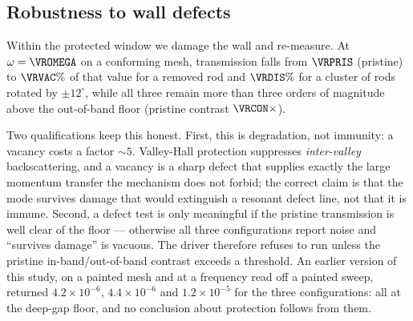 \documentclass[11pt]{article}
\begin{document}
\subsection{Robustness to wall defects}
Within the protected window we damage the wall and re-measure. At
$\omega=\VROMEGA$ on a conforming mesh, transmission falls from $\VRPRIS$
(pristine) to $\VRVAC\%$ of that value for a removed rod and $\VRDIS\%$ for a
cluster of rods rotated by $\pm12^\circ$, while all three remain more than three
orders of magnitude above the out-of-band floor (pristine contrast $\VRCON\times$).

Two qualifications keep this honest. First, this is degradation, not immunity: a
vacancy costs a factor $\sim\!5$. Valley-Hall protection suppresses
\emph{inter-valley} backscattering, and a vacancy is a sharp defect that supplies
exactly the large momentum transfer the mechanism does not forbid; the correct
claim is that the mode survives damage that would extinguish a resonant defect
line, not that it is immune. Second, a defect test is only meaningful if the
pristine transmission is well clear of the floor --- otherwise all three
configurations report noise and ``survives damage'' is vacuous. The driver
therefore refuses to run unless the pristine in-band/out-of-band contrast exceeds
a threshold. An earlier version of this study, on a painted mesh and at a
frequency read off a painted sweep, returned $4.2\times10^{-6}$,
$4.4\times10^{-6}$ and $1.2\times10^{-5}$ for the three configurations: all at
the deep-gap floor, and no conclusion about protection follows from them.

\appendix
\end{document}
